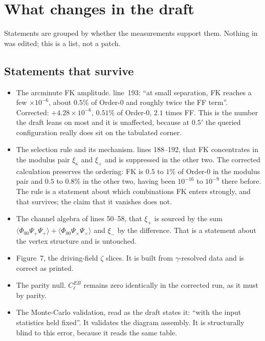 \section{What changes in the draft}
\label{sec:draft}

Statements are grouped by whether the measurements support them. Nothing in
 was edited; this is a list, not a patch.

\subsection{Statements that survive}

\begin{itemize}
\item The arcminute FK amplitude.  line~193: ``at small
separation, FK reaches a few $\times10^{-6}$, about $0.5\%$ of Order-0 and
roughly twice the FF term''. Corrected: $+4.28\times10^{-6}$, $0.51\%$ of
Order-0, $2.1$ times FF. This is the number the draft leans on most and it
is unaffected, because at $0.5'$ the queried configuration really does sit
on the tabulated corner.

\item The selection rule and its mechanism.  lines
188--192, that FK concentrates in the modulus pair $\xi_\kappa$ and
$\xi_+$ and is suppressed in the other two. The corrected calculation
preserves the ordering: FK is $0.5$ to $1\%$ of Order-0 in the modulus pair
and $0.5$ to $0.8\%$ in the other two, having been $10^{-16}$ to $10^{-9}$
there before. The rule is a statement about which combinations FK enters
strongly, and that survives; the claim that it vanishes does not.

\item The channel algebra of  lines 50--58, that
$\xi_+$ is sourced by the sum
$\langle\Phi_{00}\Psi_+\Psi_+\rangle+\langle\Phi_{00}\Psi_\times\Psi_\times\rangle$
and $\xi_-$ by the difference. That is a statement about the vertex
structure and is untouched.

\item Figure~7, the driving-field $\zeta$ slices. It is built from
$\gamma$-resolved data and is correct as printed.

\item The parity null. $C_\ell^{EB}$ remains zero identically in the
corrected run, as it must by parity.

\item The Monte-Carlo validation, read as the draft states it: ``with the
input statistics held fixed''. It validates the diagram assembly. It is
structurally blind to this error, because it reads the same table.
\end{itemize}

